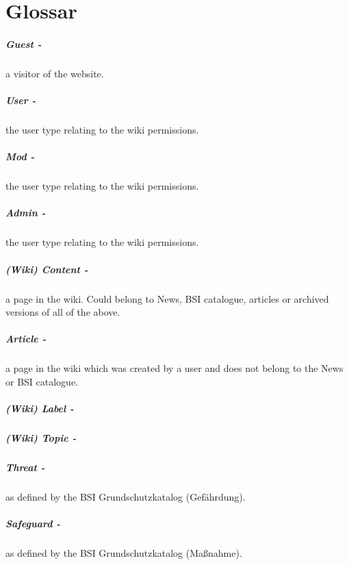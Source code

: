 \appendix
\chapter{Glossar}

\paragraph{Guest -} a visitor of the website.
\paragraph{User -} the user type relating to the wiki permissions.
\paragraph{Mod -} the user type relating to the wiki permissions. 
\paragraph{Admin -} the user type relating to the wiki permissions. 
\paragraph{(Wiki) Content -} a page in the wiki. Could belong to News, BSI catalogue, articles or archived versions of all of the above.
\paragraph{Article -} a page in the wiki which was created by a user and does not belong to the News or BSI catalogue.
\paragraph{(Wiki) Label -}
\paragraph{(Wiki) Topic -}
\paragraph{Threat -} as defined by the BSI Grundschutzkatalog (Gef\"ahrdung).
\paragraph{Safeguard -} as defined by the BSI Grundschutzkatalog (Ma\ss nahme).

